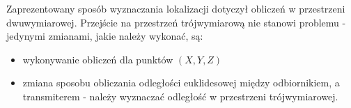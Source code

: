 Zaprezentowany sposób wyznaczania lokalizacji dotyczył obliczeń w przestrzeni dwuwymiarowej. Przejście na przestrzeń trójwymiarową nie stanowi problemu - jedynymi zmianami, jakie należy wykonać, są:
\begin{itemize}
	\item wykonywanie obliczeń dla punktów $(X,Y,Z)$
	\item zmiana sposobu obliczania odległości euklidesowej między odbiornikiem, a transmiterem - należy wyznaczać odległość w przestrzeni trójwymiarowej.
\end{itemize}
